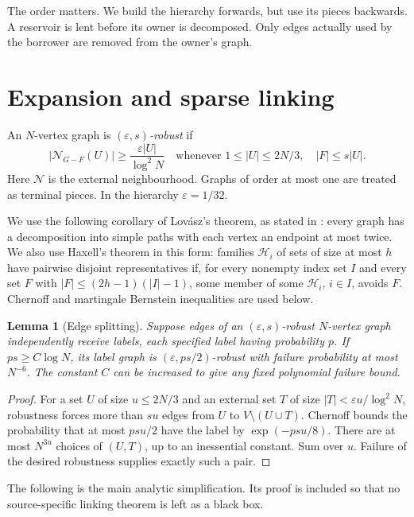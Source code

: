 \documentclass[11pt]{article}
\newtheorem{lemma}[theorem]{Lemma}
\theoremstyle{remark}\newtheorem*{remark}{Remark}
\newcommand{\eps}{\varepsilon}
\newcommand{\NN}{\mathcal N}
\begin{document}
The order matters. We build the hierarchy forwards, but use its pieces
backwards. A reservoir is lent before its owner is decomposed. Only edges
actually used by the borrower are removed from the owner's graph.

\section{Expansion and sparse linking}
An $N$-vertex graph is \emph{$(\eps,s)$-robust} if
\[
 |\NN_{G-F}(U)|\ge \frac{\eps|U|}{\log^2 N}
 \quad\text{whenever }1\le |U|\le 2N/3,\quad |F|\le s|U|.
\]
Here $\NN$ is the external neighbourhood. Graphs of order at most one
are treated as terminal pieces. In the hierarchy $\eps=1/32$.

We use the following corollary of Lov\'asz's theorem, as stated in
\cite[Corollary 22]{BM}: every graph has a decomposition into simple
paths with each vertex an endpoint at most twice.
We also use Haxell's theorem \cite{Haxell} in this form: families
$\mathcal H_i$ of sets of size at most $h$ have pairwise disjoint
representatives if, for every nonempty index set $I$ and every set $F$
with $|F|\le(2h-1)(|I|-1)$, some member of some $\mathcal H_i$, $i\in I$,
avoids $F$. Chernoff and martingale Bernstein inequalities are used below.

\begin{lemma}[Edge splitting]\label{lem:split}
Suppose edges of an $(\eps,s)$-robust $N$-vertex graph independently
receive labels, each specified label having probability $p$.
If $ps\ge C\log N$, its label graph is $(\eps,ps/2)$-robust with
failure probability at most $N^{-6}$. The constant $C$ can be increased
to give any fixed polynomial failure bound.
\end{lemma}
\begin{proof}
For a set $U$ of size $u\le2N/3$ and an external set $T$ of size
$|T|<\eps u/\log^2N$, robustness forces more than $su$ edges from $U$
to $V\setminus(U\cup T)$. Chernoff bounds the probability that at most
$psu/2$ have the label by $\exp(-psu/8)$. There are at most $N^{3u}$
choices of $(U,T)$, up to an inessential constant. Sum over $u$.
Failure of the desired robustness supplies exactly such a pair.
\end{proof}

The following is the main analytic simplification. Its proof is included
so that no source-specific linking theorem is left as a black box.
\end{document}
